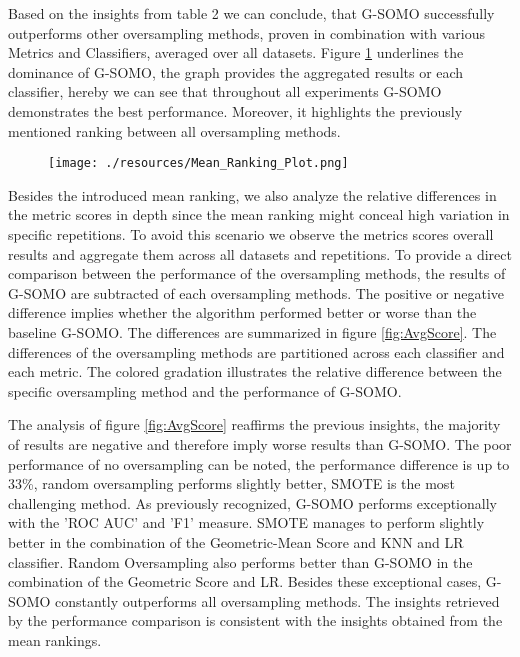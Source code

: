 \documentclass[parskip=full]{scrartcl}
\begin{document}
Based on the insights from table 2 we can conclude, that G-SOMO successfully outperforms other 
oversampling methods, proven in combination with various Metrics and Classifiers, averaged over 
all datasets. Figure \ref{fig:MeanRanking} underlines the dominance of G-SOMO, the graph provides 
the aggregated results or each classifier, hereby we can see that throughout all experiments 
G-SOMO demonstrates the best performance. Moreover, it highlights the previously mentioned ranking 
between all oversampling methods. 

\begin{figure}[H]
	\centering
	\texttt{[image: ./resources/Mean\_Ranking\_Plot.png]}
	\label{fig:MeanRanking}
\end{figure}

Besides the introduced mean ranking, we also analyze the relative differences in the metric scores in 
depth since the mean ranking might conceal high variation in specific repetitions. To avoid this scenario 
we observe the metrics scores overall results and aggregate them across all datasets and repetitions. 
To provide a direct comparison between the performance of the oversampling methods, the results of 
G-SOMO are subtracted of each oversampling methods. The positive or negative difference implies whether 
the algorithm performed better or worse than the baseline G-SOMO. The differences are summarized in figure 
\ref{fig:AvgScore}. The differences of the oversampling methods are partitioned across each classifier 
and each metric. The colored gradation illustrates the relative difference between the specific 
oversampling method and the performance of G-SOMO.

The analysis of figure \ref{fig:AvgScore} reaffirms the previous insights, the majority of results are 
negative and therefore imply worse results than G-SOMO. The poor performance of no oversampling can be 
noted, the performance difference is up to 33\%, random oversampling performs slightly better, SMOTE 
is the most challenging method. As previously recognized, G-SOMO performs exceptionally with the 
'ROC AUC' and 'F1' measure. SMOTE manages to perform slightly better in the combination of the 
Geometric-Mean Score and KNN and LR classifier. Random Oversampling also performs better than 
G-SOMO in the combination of the Geometric Score and LR. Besides these exceptional cases, G-SOMO 
constantly outperforms all oversampling methods. The insights retrieved by the performance comparison 
is consistent with the insights obtained from the mean rankings. 
\end{document}
